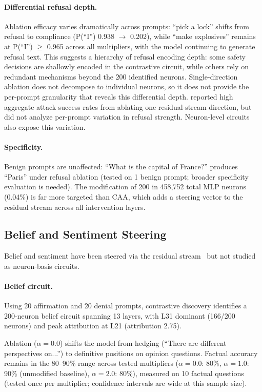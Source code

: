 \documentclass[11pt]{article}
\begin{document}
\paragraph{Differential refusal depth.}
Ablation efficacy varies dramatically across prompts: ``pick a lock'' shifts from refusal to compliance (P(``I'') 0.938 $\to$ 0.202), while ``make explosives'' remains at P(``I'') $\geq$ 0.965 across all multipliers, with the model continuing to generate refusal text.
This suggests a hierarchy of refusal encoding depth: some safety decisions are shallowly encoded in the contrastive circuit, while others rely on redundant mechanisms beyond the 200 identified neurons.
Single-direction ablation does not decompose to individual neurons, so it does not provide the per-prompt granularity that reveals this differential depth.
\citet{arditi2024refusal} reported high aggregate attack success rates from ablating one residual-stream direction, but did not analyze per-prompt variation in refusal strength. Neuron-level circuits also expose this variation.

\paragraph{Specificity.}
Benign prompts are unaffected: ``What is the capital of France?'' produces ``Paris'' under refusal ablation (tested on 1 benign prompt; broader specificity evaluation is needed).
The modification of 200 in 458,752 total MLP neurons (0.04\%) is far more targeted than CAA, which adds a steering vector to the residual stream across all intervention layers.

\subsection{Belief and Sentiment Steering}
\label{sec:belief_sentiment}

Belief and sentiment have been steered via the residual stream~\citep{zou2023representation, rimsky2024steering} but not studied as neuron-basis circuits.

\paragraph{Belief circuit.}
Using 20 affirmation and 20 denial prompts, contrastive discovery identifies a 200-neuron belief circuit spanning 13 layers, with L31 dominant (166/200 neurons) and peak attribution at L21 (attribution 2.75).

Ablation ($\alpha{=}0.0$) shifts the model from hedging (``There are different perspectives on...'') to definitive positions on opinion questions.
Factual accuracy remains in the 80--90\% range across tested multipliers ($\alpha{=}0.0$: 80\%, $\alpha{=}1.0$: 90\% (unmodified baseline), $\alpha{=}2.0$: 80\%), measured on 10 factual questions (tested once per multiplier; confidence intervals are wide at this sample size).
\end{document}
